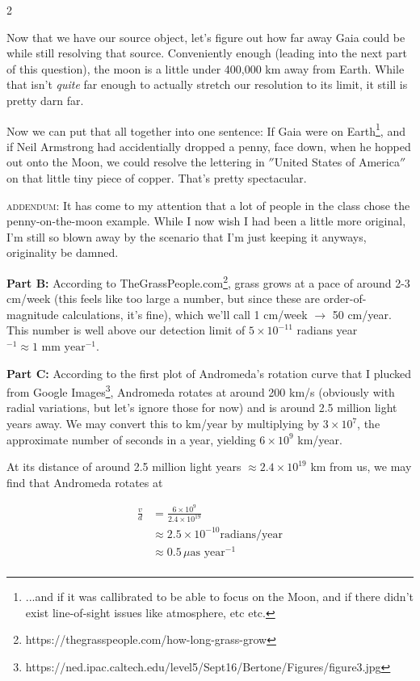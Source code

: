 \documentclass[12pt]{article}
\newenvironment{answer}[2][Answer]{\begin{trivlist}
\item[\hskip \labelsep {\bfseries #1}\hskip \labelsep {\bfseries #2.}]}{\end{trivlist}}
\newcommand\textlcsc[1]{\textsc{\MakeLowercase{#1}}}
\begin{document}
\begin{multicols*}{2}
\begin{answer}{5}
Now that we have our source object, let's figure out how far away Gaia could be while still resolving that source. Conveniently enough (leading into the next part of this question), the moon is a little under 400,000 km away from Earth. While that isn't \textit{quite} far enough to actually stretch our resolution to its limit, it still is pretty darn far. \bigskip

Now we can put that all together into one sentence: If Gaia were on Earth\footnote{...and if it was callibrated to be able to focus on the Moon, and if there didn't exist line-of-sight issues like atmosphere, etc etc.}, and if Neil Armstrong had accidentially dropped a penny, face down, when he hopped out onto the Moon, we could resolve the lettering in $''$United States of America$''$ on that little tiny piece of copper. That's pretty spectacular. \bigskip

\textlcsc{ADDENDUM:} It has come to my attention that a lot of people in the class chose the penny-on-the-moon example. While I now wish I had been a little more original, I'm still so blown away by the scenario that I'm just keeping it anyways, originality be damned.

\bigskip
\noindent \textbf{Part B: } According to TheGrassPeople.com\footnote{ https://thegrasspeople.com/how-long-grass-grow}, grass grows at a pace of around 2-3 cm/week (this feels like too large a number, but since these are order-of-magnitude calculations, it's fine), which we'll call 1 cm/week $\rightarrow$ 50 cm/year. This number is well above our detection limit of $5 \times 10^{-11}$ radians year$^{-1} \approx 1 \text{ mm year}^{-1}$.

\bigskip
\noindent \textbf{Part C: } According to the first plot of Andromeda's rotation curve that I plucked from Google Images\footnote{ https://ned.ipac.caltech.edu/level5/Sept16/Bertone/Figures/figure3.jpg}, Andromeda rotates at around 200 km/s (obviously with radial variations, but let's ignore those for now) and is around 2.5 million light years away. We may convert this to km/year by multiplying by $3 \times 10^{7}$, the approximate number of seconds in a year, yielding $6 \times 10^{9}$ km/year.

At its distance of around 2.5 million light years $\approx 2.4 \times 10^{19}$ km from us, we may find that Andromeda rotates at

\begin{align*}
  \frac{v}{d} &= \frac{6 \times 10^{9}}{2.4 \times 10^{19}} \\
              &\approx 2.5 \times 10^{-10} \text{radians/year} \\
              &\approx 0.5 \, \mu \text{as year$^{-1}$} \\
\end{align*}


\end{answer}
\end{multicols*}
\end{document}
